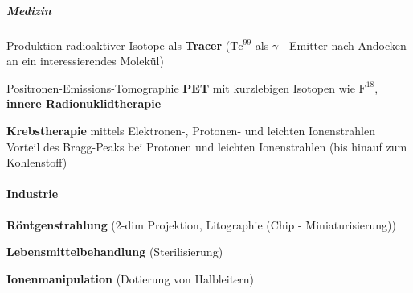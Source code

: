 \documentclass[12pt,DIV=15,a4paper,twoside,draft=false]{scrartcl}
\begin{document}
\subparagraph{Medizin}
Produktion radioaktiver Isotope als \textbf{Tracer} ($\mathrm{Tc^{99}}$ als $γ$ - Emitter nach Andocken an ein interessierendes Molekül)

Positronen-Emissions-Tomographie \textbf{PET} mit kurzlebigen Isotopen wie $\mathrm{F^{18}}$, \textbf{innere Radionuklidtherapie}

\textbf{Krebstherapie} mittels Elektronen-, Protonen- und leichten Ionenstrahlen\\
Vorteil des Bragg-Peaks bei Protonen und leichten Ionenstrahlen (bis hinauf zum Kohlenstoff)

\paragraph{Industrie}
\textbf{Röntgenstrahlung} (2-dim Projektion, Litographie (Chip - Miniaturisierung))

\textbf{Lebensmittelbehandlung} (Sterilisierung)

\textbf{Ionenmanipulation} (Dotierung von Halbleitern)
\end{document}
